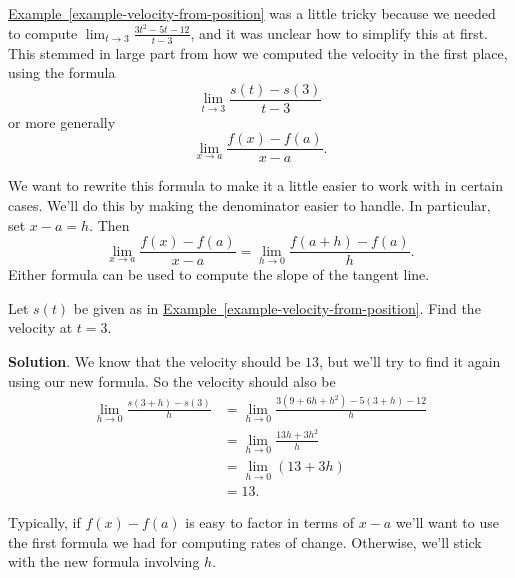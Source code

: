 \documentclass[10pt,]{book}
\theoremstyle{ptxplainnotitle}
\theoremstyle{ptxplaintitle}
\theoremstyle{ptxplainnotitle}
\theoremstyle{ptxplaintitle}
\theoremstyle{ptxplainnotitle}
\theoremstyle{ptxplaintitle}
\theoremstyle{ptxdefinitionnotitle}
\theoremstyle{ptxdefinitiontitle}
\theoremstyle{ptxdefinitionnotitle}
\theoremstyle{ptxdefinitiontitle}
\theoremstyle{ptxdefinitionnotitle}
\theoremstyle{ptxdefinitiontitle}
\theoremstyle{ptxdefinitionnotitle}
\theoremstyle{ptxdefinitiontitle}
\theoremstyle{ptxdefinitionnotitle}
\theoremstyle{ptxdefinitiontitle}
\numberwithin{equation}{section}
\begin{document}
\hypertarget{p-86}{}%
\hyperref[example-velocity-from-position]{Example~\ref{example-velocity-from-position}} was a little tricky because we needed to compute \(\lim_{t\to3}\frac{3t^{2}-5t-12}{t-3}\), and it was unclear how to simplify this at first. This stemmed in large part from how we computed the velocity in the first place, using the formula%
\begin{equation*}
\lim_{t\to3}\frac{s(t)-s(3)}{t-3}
\end{equation*}
or more generally%
\begin{equation*}
\lim_{x\to a}\frac{f(x) - f(a)}{x-a}\text{.}
\end{equation*}
%
\par
\hypertarget{p-87}{}%
We want to rewrite this formula to make it a little easier to work with in certain cases. We'll do this by making the denominator easier to handle. In particular, set \(x-a = h\). Then%
\begin{equation*}
\lim_{x\to a}\frac{f(x) - f(a)}{x-a} = \lim_{h\to0}\frac{f(a+h)-f(a)}{h}.
\end{equation*}
Either formula can be used to compute the slope of the tangent line.%
\begin{example}\label{example-velocity-revisited}
\hypertarget{p-88}{}%
Let \(s(t)\) be given as in \hyperref[example-velocity-from-position]{Example~\ref{example-velocity-from-position}}. Find the velocity at \(t=3\).%
\par\smallskip%
\noindent\textbf{Solution}.\hypertarget{solution-19}{}\quad%
\hypertarget{p-89}{}%
We know that the velocity should be \(13\), but we'll try to find it again using our new formula. So the velocity should also be%
%
\begin{align*}
\lim_{h\to0}\frac{s(3+h)-s(3)}{h} & = \lim_{h\to0}\frac{3(9+6h+h^{2})-5(3+h)-12}{h} \\
& = \lim_{h\to0}\frac{13h+3h^{2}}{h} \\
& = \lim_{h\to0}(13+3h) \\
& = 13. 
\end{align*}
\end{example}
\hypertarget{p-90}{}%
Typically, if \(f(x)-f(a)\) is easy to factor in terms of \(x-a\) we'll want to use the first formula we had for computing rates of change. Otherwise, we'll stick with the new formula involving \(h\).%
\typeout{************************************************}
\typeout{************************************************}
\end{document}
